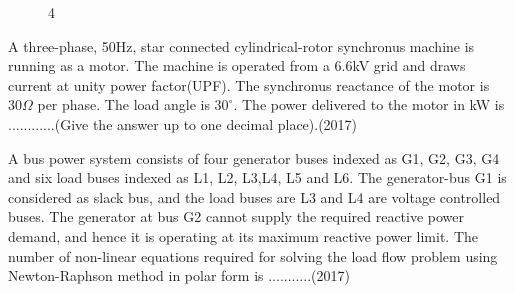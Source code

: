     \begin{figure}[!ht]
        \centering
        \caption{4}
    \end{figure}
    \item A three-phase, 50Hz, star connected cylindrical-rotor synchronus machine is running as a motor. The machine is operated from a 6.6kV grid and draws current at unity power factor(UPF). The synchronus reactance of the motor is $30\Omega$ per phase. The load angle is $30^{\circ}$. The power delivered to the motor in kW is ............(Give the answer up to one decimal place).\hfill (2017)
    \item A bus power system consists of four generator buses indexed as G1, G2, G3, G4 and six load buses indexed as L1, L2, L3,L4, L5 and L6. The generator-bus G1 is considered as slack bus, and the load buses are L3 and L4 are voltage controlled buses. The generator at bus G2 cannot supply the required reactive power demand, and hence it is operating at its maximum reactive power limit. The number of non-linear equations required for solving the load flow problem using Newton-Raphson method in polar form is ...........\hfill (2017)
